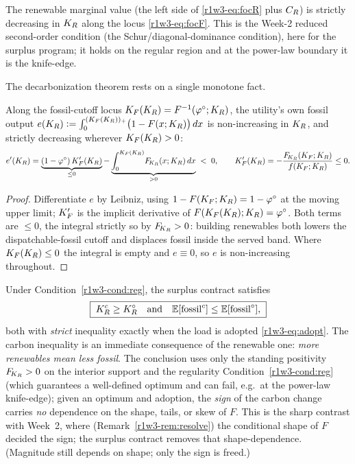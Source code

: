 \begin{condition}\label{r1w3-cond:reg}
The renewable marginal value (the left side of \eqref{r1w3-eq:focR} plus $C_R$) is strictly
decreasing in $K_R$ along the locus \eqref{r1w3-eq:focF}. This is the Week-2 reduced
second-order condition (the Schur/diagonal-dominance condition), here for the
surplus program; it holds on the regular region and at the power-law boundary it is
the knife-edge.
\end{condition}

The decarbonization theorem rests on a single monotone fact.

\begin{lemma}\label{r1w3-lem:monofossil}
Along the fossil-cutoff locus $K_F(K_R)=F^{-1}(\varphi^{\circ};K_R)$, the utility's own
fossil output
$e(K_R)\vcentcolon=\int_0^{(K_F(K_R))_+}\!\big(1-F(x;K_R)\big)\,dx$
is non-increasing in $K_R$, and strictly decreasing wherever $K_F(K_R)>0$:
\[
  e'(K_R)=\underbrace{(1-\varphi^{\circ})\,K_F'(K_R)}_{\le0}
  -\underbrace{\int_0^{K_F(K_R)}\!F_{\!K_R}(x;K_R)\,dx}_{>0}\;<\;0,
  \qquad K_F'(K_R)=-\frac{F_{\!K_R}(K_F;K_R)}{f(K_F;K_R)}\le0 .
\]
\end{lemma}
\begin{proof}
Differentiate $e$ by Leibniz, using $1-F(K_F;K_R)=1-\varphi^{\circ}$ at the moving upper
limit; $K_F'$ is the implicit derivative of $F(K_F(K_R);K_R)=\varphi^{\circ}$. Both terms
are $\le0$, the integral strictly so by $F_{\!K_R}>0$: building renewables both lowers the
dispatchable-fossil cutoff and displaces fossil inside the served band. Where
$K_F(K_R)\le0$ the integral is empty and $e\equiv0$, so $e$ is non-increasing throughout.
\end{proof}

\begin{theorem}\label{r1w3-thm:decarb}
Under Condition~\ref{r1w3-cond:reg}, the surplus contract satisfies
\[
  \boxed{\;K_R^{c}\ge K_R^{\circ}\quad\text{and}\quad \mathbb{E}[\mathrm{fossil}^{c}]\le\mathbb{E}[\mathrm{fossil}^{\circ}],\;}
\]
both with \emph{strict} inequality exactly when the load is adopted \eqref{r1w3-eq:adopt}. The
carbon inequality is an immediate consequence of the renewable one: \emph{more renewables
mean less fossil}. The conclusion uses only the standing positivity $F_{\!K_R}>0$ on the
interior support and the regularity Condition~\ref{r1w3-cond:reg} (which guarantees a
well-defined optimum and can fail, e.g.\ at the power-law knife-edge); given an optimum
and adoption, the \emph{sign} of the carbon change carries \emph{no} dependence on the
shape, tails, or skew of $F$. This is the sharp contrast with Week~2, where
(Remark~\ref{r1w3-rem:resolve}) the conditional shape of $F$ decided the sign; the surplus
contract removes that shape-dependence. (Magnitude still depends on shape; only the sign
is freed.)
\end{theorem}

